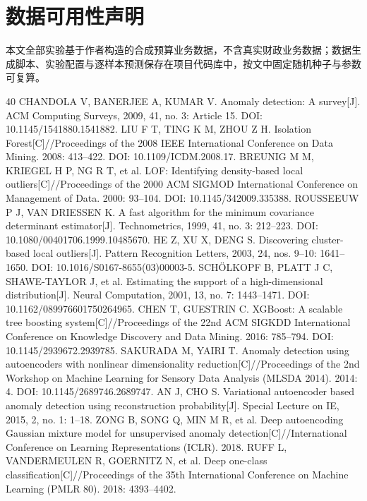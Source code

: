 \documentclass[a4paper,fleqn]{cas-dc}
\begin{document}
\section*{数据可用性声明}
本文全部实验基于作者构造的合成预算业务数据，不含真实财政业务数据；数据生成脚本、实验配置与逐样本预测保存在项目代码库中，按文中固定随机种子与参数可复算。

\renewcommand{\bibfont}{\fontsize{8pt}{9pt}\selectfont}
\renewcommand{\casbiographyfont}{\fontsize{8pt}{9pt}\selectfont}
\begin{thebibliography}{40}
 CHANDOLA V, BANERJEE A, KUMAR V. Anomaly detection: A survey[J]. ACM Computing Surveys, 2009, 41, no. 3: Article 15. DOI: 10.1145/1541880.1541882.
 LIU F T, TING K M, ZHOU Z H. Isolation Forest[C]//Proceedings of the 2008 IEEE International Conference on Data Mining. 2008: 413–422. DOI: 10.1109/ICDM.2008.17.
 BREUNIG M M, KRIEGEL H P, NG R T, et al. LOF: Identifying density-based local outliers[C]//Proceedings of the 2000 ACM SIGMOD International Conference on Management of Data. 2000: 93–104. DOI: 10.1145/342009.335388.
 ROUSSEEUW P J, VAN DRIESSEN K. A fast algorithm for the minimum covariance determinant estimator[J]. Technometrics, 1999, 41, no. 3: 212–223. DOI: 10.1080/00401706.1999.10485670.
 HE Z, XU X, DENG S. Discovering cluster-based local outliers[J]. Pattern Recognition Letters, 2003, 24, nos. 9–10: 1641–1650. DOI: 10.1016/S0167-8655(03)00003-5.
 SCHÖLKOPF B, PLATT J C, SHAWE-TAYLOR J, et al. Estimating the support of a high-dimensional distribution[J]. Neural Computation, 2001, 13, no. 7: 1443–1471. DOI: 10.1162/089976601750264965.
 CHEN T, GUESTRIN C. XGBoost: A scalable tree boosting system[C]//Proceedings of the 22nd ACM SIGKDD International Conference on Knowledge Discovery and Data Mining. 2016: 785–794. DOI: 10.1145/2939672.2939785.
 SAKURADA M, YAIRI T. Anomaly detection using autoencoders with nonlinear dimensionality reduction[C]//Proceedings of the 2nd Workshop on Machine Learning for Sensory Data Analysis (MLSDA 2014). 2014: 4. DOI: 10.1145/2689746.2689747.
 AN J, CHO S. Variational autoencoder based anomaly detection using reconstruction probability[J]. Special Lecture on IE, 2015, 2, no. 1: 1–18.
 ZONG B, SONG Q, MIN M R, et al. Deep autoencoding Gaussian mixture model for unsupervised anomaly detection[C]//International Conference on Learning Representations (ICLR). 2018.
 RUFF L, VANDERMEULEN R, GOERNITZ N, et al. Deep one-class classification[C]//Proceedings of the 35th International Conference on Machine Learning (PMLR 80). 2018: 4393–4402.

\end{thebibliography}
\end{document}
